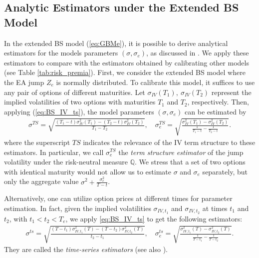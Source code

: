 \documentclass[11pt]{article}
\numberwithin{equation}{section}
\numberwithin{theorem}{section}
\begin{document}
\subsection{Analytic Estimators under the Extended BS Model}\label{sub:Analytic-Estimators}
In  the extended BS model (\ref{eq:GBMe}), it is  possible to derive analytical estimators for the models parameters $(\sigma, \sigma_e)$, as discussed in \cite{Dubinsky2006}. We apply these estimators to compare with the estimators obtained by calibrating other models (see Table \ref{tab:risk_premia}).  First, we consider the extended BS model where the EA jump $Z_{e}$ is  normally distributed.  To calibrate this model, it suffices to use any pair of  options of  different maturities. Let $\sigma_{IV}\left(T_{1}\right),\ \sigma_{IV}\left(T_{2}\right)$
represent the implied volatilities of two options with maturities $T_{1}$ and $T_{2}$, respectively. Then, applying  (\ref{eq:BS_IV_ts}), the model  parameters $(\sigma,\sigma_e)$  can be estimated by  
\begin{align}
\sigma^{TS}  =  \sqrt{\frac{\left(T_{1}-t\right)\sigma_{IV}^{2}\left(T_{1}\right)-\left(T_{2}-t\right)\sigma_{IV}^{2}\left(T_{2}\right)}{T_{1}-T_{2}}}, \quad
\sigma_{e}^{TS}  =  \sqrt{\frac{\sigma_{IV}^{2}\left(T_{1}\right)-\sigma_{IV}^{2}\left(T_{2}\right)}{\frac{1}{T_{1}-t}-\frac{1}{T_{2}-t}}}.\label{eq:BS_TS_estimator}
\end{align}
where the superscript $TS$ indicates the relevance of the   IV term structure to these  estimators. In particular, we call  $\sigma_{e}^{TS}$ the \emph{term structure
estimator} of the jump volatility under the risk-neutral measure $\mathbb{Q}$.  We stress that a set of two options
with identical maturity would not allow us to estimate  $\sigma$ and $\sigma_{e}$ separately, but only the aggregate value $\sigma^{2}+\frac{\sigma_{e}^{2}}{T-t}$. 

Alternatively, one can  utilize option prices at different times for parameter estimation. In fact, given the implied volatilities $\sigma_{IV,t_{1}}$
and $\sigma_{IV,t_{2}}$ at times $t_{1}$ and $t_{2}$, with $t_{1}<t_{2}<T_{e}$, we apply \eqref{eq:BS_IV_ts} to get  the following estimators:
\begin{align}
\sigma^{ts}  = \sqrt{\frac{\left(T-t_{1}\right)\sigma_{IV,t_{1}}^{2}\left(T\right)-\left(T-t_{2}\right)\sigma_{IV,t_{2}}^{2}\left(T\right)}{t_{2}-t_{1}}},\quad
\sigma_{e}^{ts}  =  \sqrt{\frac{\sigma_{IV,t_{1}}^{2}\left(T\right)-\sigma_{IV,t_{2}}^{2}\left(T\right)}{\frac{1}{T-t_{1}}-\frac{1}{T-t_{2}}}}.\label{eq:BS_ts_estimator}
\end{align}
They are called   the \emph{time-series estimators} (see also \cite{Dubinsky2006}). 
\end{document}
